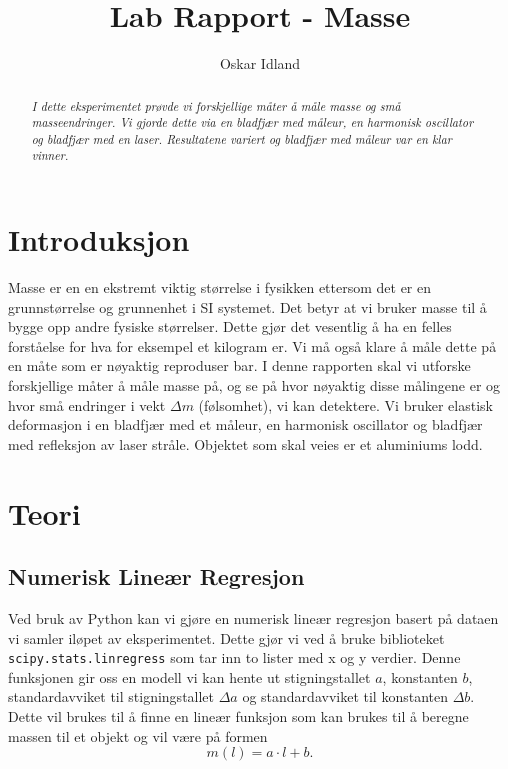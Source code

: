 \documentclass[reprint,norsk,notitlepage]{revtex4-2}
\begin{document}
\title{Lab Rapport - Masse}
\author{Oskar Idland}
\date{}


\begin{abstract}
\textit{I dette eksperimentet prøvde vi forskjellige måter å måle masse og små masseendringer. Vi gjorde dette via en bladfjær med måleur, en harmonisk oscillator og bladfjær med en laser. Resultatene variert og bladfjær med måleur var en klar vinner. }
\end{abstract}
\maketitle

\section{Introduksjon} \label{sec: introduction}
Masse er en en ekstremt viktig størrelse i fysikken ettersom det er en grunnstørrelse og grunnenhet i SI systemet. Det betyr at vi bruker masse til å bygge opp andre fysiske størrelser. Dette gjør det vesentlig å ha en felles forståelse for hva for eksempel et kilogram er. Vi må også klare å måle dette på en måte som er nøyaktig reproduser bar. I denne rapporten skal vi utforske forskjellige måter å måle masse på, og se på hvor nøyaktig disse målingene er og hvor små endringer i vekt $Δm$ (følsomhet), vi kan detektere. Vi bruker elastisk deformasjon i en bladfjær med et måleur, en harmonisk oscillator og bladfjær med refleksjon av laser stråle. Objektet som skal veies er et aluminiums lodd.

\section{Teori} \label{sec: theory}
\subsection{Numerisk Lineær Regresjon} \label{ssec: linear regression}
Ved bruk av Python kan vi gjøre en numerisk lineær regresjon basert på dataen vi samler iløpet av eksperimentet. Dette gjør vi ved å bruke biblioteket \texttt{scipy.stats.linregress} som tar inn to lister med x og y verdier. Denne funksjonen gir oss en modell vi kan hente ut stigningstallet $a$, konstanten $b$, standardavviket til stigningstallet $Δa$ og standardavviket til konstanten $Δb$. Dette vil brukes til å finne en lineær funksjon som kan brukes til å beregne massen til et objekt og vil være på formen 
\begin{equation}\label{eq: linear regression}
    m(l) = a ⋅ l + b.
\end{equation}
\end{document}
